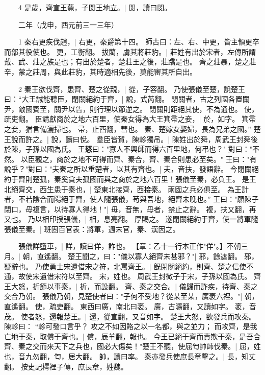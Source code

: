 　　4 是歲，齊宣王薨，子閔王地立。|{
	閔，讀曰閔。
}

　　二年（戊申，西元前三一三年）

　　1 秦右更疾伐趙，|{
	右更，秦爵第十四。
	師古曰：左、右、中更，皆主領更卒而部其役使也。
	更，工衡翻。
}
拔藺，虜其將莊豹。|{
	莊姓有出於宋者，左傳所謂戴、武、莊之族是也；有出於楚者，楚莊王之後，莊蹻是也。
	齊之莊暴，楚之莊辛，蒙之莊周，與此莊豹，其時適相先後，莫能審其所自出。
}

　　2 秦王欲伐齊，患齊、楚之從親，|{
	從，子容翻。
}
乃使張儀至楚，說楚王曰：“大王誠能聽臣，閉關絕約于齊，|{
	說，式芮翻。
	閉關者，古之列國各置關尹，敵國賓至，關尹以告，則行理以節逆之。
	閉關則距絕其使，不為通也。
	使，疏吏翻。
}
臣請獻商於之地六百里，使秦女得為大王箕帚之妾，|{
	於，如字。
	箕帚之妾，猶言備灑掃也。
	帚，止酉翻，彗也。
}
秦、楚嫁女娶婦，長為兄弟之國。”
楚王說而許之。|{
	說，讀曰悅。
}
羣臣皆賀，陳軫獨吊。|{
	陳姓出於舜，周武王封舜後於陳，子孫以國為氏。
}
王\textbf{\large{怒}}曰："寡人不興師而得六百里地，何弔也？"
對曰："不然。
	以臣觀之，商於之地不可得而齊、秦合，齊、秦合則患必至矣。" 王曰："有說乎？"對曰："夫秦之所以重楚者，以其有齊也。|{
	夫，音扶，發語辭。
}
今閉關絕約于齊則楚孤，秦奚貪夫孤國而與之商於之地六百里！張儀至秦，必負王。
	是王北絕齊交，西生患于秦也，|{
	楚東北接齊，西接秦。
}
兩國之兵必俱至。
	為王計者，不若陰合而陽絕于齊，使人隨張儀，苟與吾地，絕齊未晚也。”
	王曰："願陳子閉口，毋複言，以待寡人得地！"|{
	毋，音無，毋者，禁止之辭。
	複，扶又翻，再又也。
}
乃以相印授張儀，|{
	相，息亮翻。
}
厚賜之。
遂閉關絕約于齊，使一將軍隨張儀至秦。|{
	班固百官表：將軍，週末官，秦、漢因之。
}

　　張儀詳墮車，|{
	詳，讀曰佯，詐也。
}
【章：乙十一行本正作"佯"。】不朝三月。|{
	朝，直遙翻。
}
楚王聞之，曰："儀以寡人絕齊未甚邪？"|{
	邪，餘遮翻。
	邪，疑辭也。
}
乃使勇士宋遺借宋之符，北罵齊王。|{
	旣閉關絕約，則齊、楚之信使不通，故使宋遺借宋符以至齊。
	宋，姓也。
	周武王封微子于宋，子孫以國為氏。
}
齊王大怒，折節以事秦，|{
	折，而設翻。
}
齊、秦之交合。|{
	儀歸而詐疾，待齊、秦之交合乃朝。
}
張儀乃朝，見楚使者曰："子何不受地？從某至某，廣袤六裡。"|{
	朝，直遙翻。
	使，疏吏翻。
	東西曰廣，南北曰袤。
	廣，古曠翻，又讀如字。
	袤，音茂。
}
使者怒，還報楚王。|{
	還，從宣翻，又音如字。
}
楚王大怒，欲發兵而攻秦。
陳軫曰：
	“軫可發口言乎？
	攻之不如因賂之以一名都，與之並力；
	而攻齊，是我亡地于秦，取償于齊也。|{
	償，辰羊翻，報也。
}
今王已絕于齊而責欺于秦，是吾合齊、秦之交而來天下之兵也，國必大傷矣！"楚王不聽，使屈匄帥師伐秦。|{
	屈，姓也，音九勿翻，匄，居大翻。
	帥，讀曰率。
}
秦亦發兵使庶長章擊之。|{
	長，知丈翻。
	按史記樗裡子傳，庶長章，姓魏。
}


